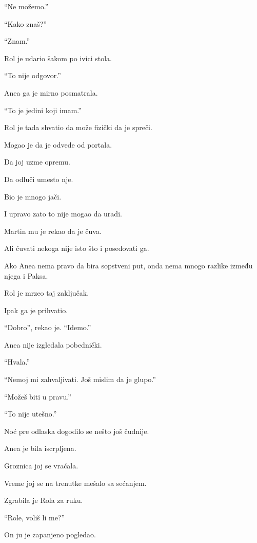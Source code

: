 ``Ne možemo.''

``Kako znaš?''

``Znam.''

Rol je udario šakom po ivici stola.

``To nije odgovor.''

Anea ga je mirno posmatrala.

``To je jedini koji imam.''

\bigskip

Rol je tada shvatio da može fizički da je spreči.

Mogao je da je odvede od portala.

Da joj uzme opremu.

Da odluči umesto nje.

Bio je mnogo jači.

\bigskip

I upravo zato to nije mogao da uradi.

\bigskip

Martin mu je rekao da je čuva.

Ali čuvati nekoga nije isto što i posedovati ga.

Ako Anea nema pravo da bira sopstveni put, onda nema mnogo razlike između njega i Paksa.

\bigskip

Rol je mrzeo taj zaključak.

Ipak ga je prihvatio.

\bigskip

``Dobro'', rekao je. ``Idemo.''

Anea nije izgledala pobednički.

``Hvala.''

``Nemoj mi zahvaljivati. Još mislim da je glupo.''

``Možeš biti u pravu.''

``To nije utešno.''

\bigskip

Noć pre odlaska dogodilo se nešto još čudnije.

Anea je bila iscrpljena.

Groznica joj se vraćala.

Vreme joj se na trenutke mešalo sa sećanjem.

\bigskip

Zgrabila je Rola za ruku.

``Role, voliš li me?''

\bigskip

On ju je zapanjeno pogledao.

